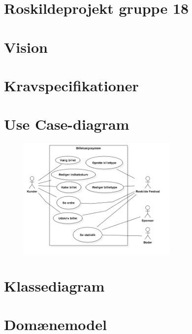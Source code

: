 


\section{Roskildeprojekt gruppe 18}

\section{Vision}

\section{Kravspecifikationer}

\section{Use Case-diagram}
\begin{figure}
    \begin{center}
        \includegraphics[width=0.7\textwidth]{UseCaseDiagram.png}
    \end{center}
\end{figure}

\section{Klassediagram}

\section{Domænemodel}


